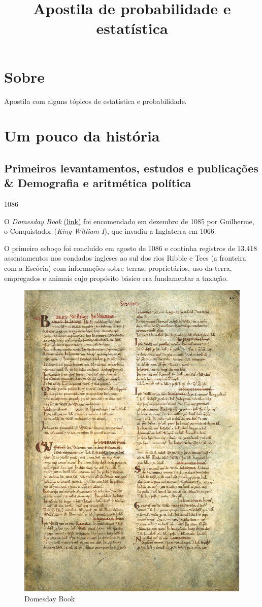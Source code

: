\documentclass[
]{book}
\title{Apostila de probabilidade e estatística}
\author{}
\date{\vspace{-2.5em}}
\theoremstyle{definition}
\theoremstyle{definition}
\theoremstyle{definition}
\theoremstyle{definition}
\theoremstyle{remark}
\begin{document}
\maketitle

{
\setcounter{tocdepth}{1}
\tableofcontents
}
\hypertarget{sobre}{%
\chapter{Sobre}\label{sobre}}

Apostila com alguns tópicos de estatística e probabilidade.

\hypertarget{um-pouco-da-histuxf3ria}{%
\chapter{Um pouco da história}\label{um-pouco-da-histuxf3ria}}

\hypertarget{primeiros-levantamentos-estudos-e-publicauxe7uxf5es-demografia-e-aritmuxe9tica-poluxedtica}{%
\section{Primeiros levantamentos, estudos e publicações \& Demografia e aritmética política}\label{primeiros-levantamentos-estudos-e-publicauxe7uxf5es-demografia-e-aritmuxe9tica-poluxedtica}}

1086

O \emph{Domesday Book} \href{http://www.nationalarchives.gov.uk/education/resources/domesday-book/}{(link)}
foi encomendado em dezembro de 1085 por Guilherme, o Conquistador (\emph{King William I}), que invadiu a Inglaterra em 1066.

O primeiro esboço foi concluído em agosto de 1086 e continha registros de 13.418 assentamentos nos condados ingleses ao sul dos rios Ribble e Tees (a fronteira com a Escócia) com informações sobre terras, proprietários, uso da terra, empregados e animais cujo propósito básico era fundamentar a taxação.

\begin{figure}

{\centering \includegraphics[width=0.5\linewidth]{images/domesday} 

}

\caption{Domesday Book}\label{fig:unnamed-chunk-2}
\end{figure}
\end{document}
